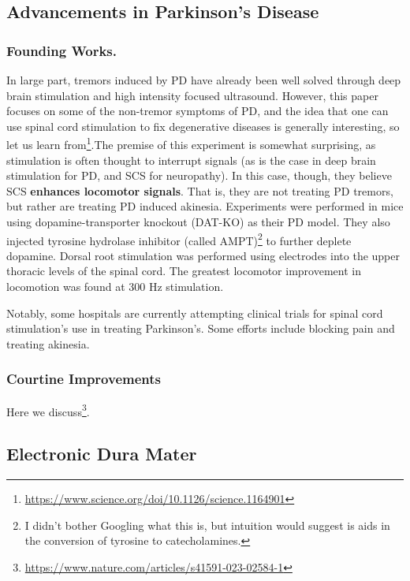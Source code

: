 \documentclass[12pt]{report}
\begin{document}
\subsection{Advancements in Parkinson's Disease}

\subsubsection{Founding Works.}

In large part, tremors induced by PD have already been well solved through deep brain stimulation and high intensity focused ultrasound. However, this paper focuses on some of the non-tremor symptoms of PD, and the idea that one can use spinal cord stimulation to fix degenerative diseases is generally interesting, so let us learn from\footnote{\url{https://www.science.org/doi/10.1126/science.1164901}}.The premise of this experiment is somewhat surprising, as stimulation is often thought to interrupt signals (as is the case in deep brain stimulation for PD, and SCS for neuropathy). In this case, though, they believe SCS \textbf{enhances locomotor signals}. That is, they are not treating PD tremors, but rather are treating PD induced akinesia. Experiments were performed in mice using dopamine-transporter knockout (DAT-KO) as their PD model. They also injected tyrosine hydrolase inhibitor (called AMPT)\footnote{I didn't bother Googling what this is, but intuition would suggest is aids in the conversion of tyrosine to catecholamines.} to further deplete dopamine. Dorsal root stimulation was performed using electrodes into the upper thoracic levels of the spinal cord. The greatest locomotor improvement in locomotion was found at 300 Hz stimulation.\newline

Notably, some hospitals are currently attempting clinical trials for spinal cord stimulation's use in treating Parkinson's. Some efforts include blocking pain and treating akinesia. 

\subsubsection{Courtine Improvements}

Here we discuss\footnote{\url{https://www.nature.com/articles/s41591-023-02584-1}}. 

\subsection{Electronic Dura Mater}
\end{document}
